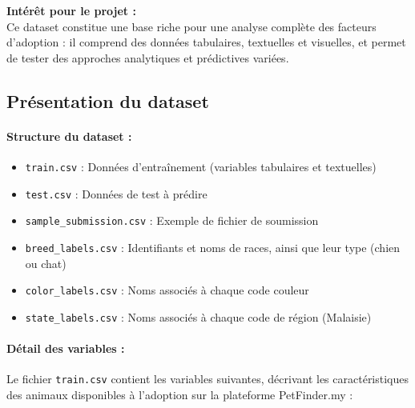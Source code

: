 \documentclass[a4paper,12pt]{article}
\begin{document}
\medskip

\noindent
\textbf{Intérêt pour le projet :} \\
Ce dataset constitue une base riche pour une analyse complète des facteurs d’adoption : il comprend des données tabulaires, textuelles et visuelles, et permet de tester des approches analytiques et prédictives variées.

\subsection {Présentation du dataset}


\paragraph{Structure du dataset :}
\begin{itemize}
    \item \texttt{train.csv} : Données d'entraînement (variables tabulaires et textuelles)
    \item \texttt{test.csv} : Données de test à prédire
    \item \texttt{sample\_submission.csv} : Exemple de fichier de soumission
    \item \texttt{breed\_labels.csv} : Identifiants et noms de races, ainsi que leur type (chien ou chat)
    \item \texttt{color\_labels.csv} : Noms associés à chaque code couleur
    \item \texttt{state\_labels.csv} : Noms associés à chaque code de région (Malaisie)
\end{itemize}

\paragraph{Détail des variables :}

Le fichier \texttt{train.csv} contient les variables suivantes, décrivant les caractéristiques des animaux disponibles à l’adoption sur la plateforme PetFinder.my :
\end{document}
